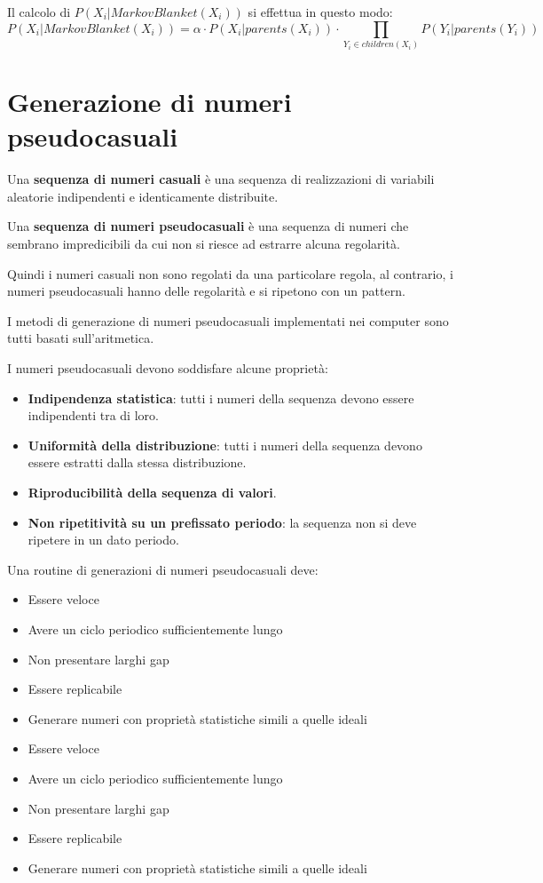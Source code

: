 Il calcolo di $P(X_i | MarkovBlanket(X_i))$ si effettua in questo modo:
\begin{equation}
    P(X_i | MarkovBlanket(X_i)) = \alpha \cdot P(X_i | parents(X_i)) \cdot
    \prod_{Y_i\in children(X_i)} P(Y_i| parents(Y_i))
\end{equation}
\section{Generazione di numeri pseudocasuali}
\begin{definizione} 
    Una \textbf{sequenza di numeri casuali} è una sequenza di realizzazioni di
    variabili aleatorie indipendenti e identicamente distribuite.
\end{definizione}
\begin{definizione} 
    Una \textbf{sequenza di numeri pseudocasuali} è una sequenza di numeri che
    sembrano impredicibili da cui non si riesce ad estrarre alcuna regolarità.
\end{definizione}
Quindi i numeri casuali non sono regolati da una particolare regola, al contrario,
i numeri pseudocasuali hanno delle regolarità e si ripetono con un pattern.
\begin{nota}
    I metodi di generazione di numeri pseudocasuali implementati nei computer
    sono tutti basati sull'aritmetica.
\end{nota}
I numeri pseudocasuali devono soddisfare alcune proprietà:
\begin{itemize}
    \item \textbf{Indipendenza statistica}: tutti i numeri della sequenza devono
          essere indipendenti tra di loro.
    \item \textbf{Uniformità della distribuzione}: tutti i numeri della sequenza
          devono essere estratti dalla stessa distribuzione.
    \item \textbf{Riproducibilità della sequenza di valori}.
    \item \textbf{Non ripetitività su un prefissato periodo}: la sequenza non si
          deve ripetere in un dato periodo.
\end{itemize}
Una routine di generazioni di numeri pseudocasuali deve:
\begin{itemize}
    \item Essere veloce
    \item Avere un ciclo periodico sufficientemente lungo
    \item Non presentare larghi gap
    \item Essere replicabile
    \item Generare numeri con proprietà statistiche simili a quelle ideali
    \item Essere veloce
    \item Avere un ciclo periodico sufficientemente lungo
    \item Non presentare larghi gap
    \item Essere replicabile
    \item Generare numeri con proprietà statistiche simili a quelle ideali
\end{itemize}
